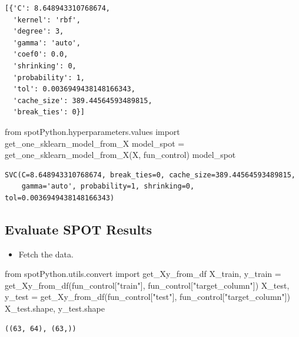 \documentclass[
  letterpaper,
  DIV=11,
  numbers=noendperiod]{scrreprt}
\newenvironment{Shaded}{\begin{snugshade}}{\end{snugshade}}
\newcommand{\ImportTok}[1]{\textcolor[rgb]{0.00,0.46,0.62}{#1}}
\newcommand{\NormalTok}[1]{\textcolor[rgb]{0.00,0.23,0.31}{#1}}
\newcommand{\OperatorTok}[1]{\textcolor[rgb]{0.37,0.37,0.37}{#1}}
\newcommand{\StringTok}[1]{\textcolor[rgb]{0.13,0.47,0.30}{#1}}
\providecommand{\tightlist}{%
  \setlength{\itemsep}{0pt}\setlength{\parskip}{0pt}}\usepackage{longtable,booktabs,array}
\begin{document}
\begin{verbatim}
[{'C': 8.648943310768674,
  'kernel': 'rbf',
  'degree': 3,
  'gamma': 'auto',
  'coef0': 0.0,
  'shrinking': 0,
  'probability': 1,
  'tol': 0.0036949438148166343,
  'cache_size': 389.44564593489815,
  'break_ties': 0}]
\end{verbatim}

\begin{Shaded}
\begin{Highlighting}[]
\ImportTok{from}\NormalTok{ spotPython.hyperparameters.values }\ImportTok{import}\NormalTok{ get\_one\_sklearn\_model\_from\_X}
\NormalTok{model\_spot }\OperatorTok{=}\NormalTok{ get\_one\_sklearn\_model\_from\_X(X, fun\_control)}
\NormalTok{model\_spot}
\end{Highlighting}
\end{Shaded}

\begin{verbatim}
SVC(C=8.648943310768674, break_ties=0, cache_size=389.44564593489815,
    gamma='auto', probability=1, shrinking=0, tol=0.0036949438148166343)
\end{verbatim}

\hypertarget{evaluate-spot-results-2}{%
\subsection{Evaluate SPOT Results}\label{evaluate-spot-results-2}}

\begin{itemize}
\tightlist
\item
  Fetch the data.
\end{itemize}

\begin{Shaded}
\begin{Highlighting}[]
\ImportTok{from}\NormalTok{ spotPython.utils.convert }\ImportTok{import}\NormalTok{ get\_Xy\_from\_df}
\NormalTok{X\_train, y\_train }\OperatorTok{=}\NormalTok{ get\_Xy\_from\_df(fun\_control[}\StringTok{"train"}\NormalTok{], fun\_control[}\StringTok{"target\_column"}\NormalTok{])}
\NormalTok{X\_test, y\_test }\OperatorTok{=}\NormalTok{ get\_Xy\_from\_df(fun\_control[}\StringTok{"test"}\NormalTok{], fun\_control[}\StringTok{"target\_column"}\NormalTok{])}
\NormalTok{X\_test.shape, y\_test.shape}
\end{Highlighting}
\end{Shaded}

\begin{verbatim}
((63, 64), (63,))
\end{verbatim}
\end{document}
